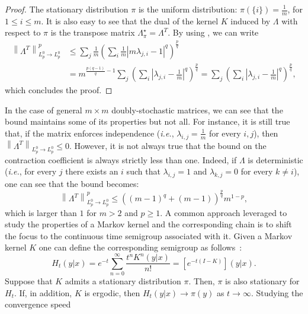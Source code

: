 \documentclass[11pt]{article}
\theoremstyle{plain}
\theoremstyle{remark}
\begin{document}
\begin{proof}
The stationary distribution $\pi$ is the uniform distribution: $\pi(\{i\})=\frac1m$, for $1\leq i \leq m$. It is also easy to see that the dual of the kernel $K$ induced by $\Lambda$ with respect to $\pi$ is the transpose matrix $\Lambda^\star_\pi = \Lambda^T$. By using , we can write
\begin{align}
    \left\lVert \Lambda^T  \right\rVert_{L_p^0 \to L_p^0}^p &\leq \sum_j \frac1m \left(\sum_i \frac1m |m\lambda_{j,i}-1|^q \right)^\frac{p}{q} \\
    &= m^{\frac{p (q-1)}{q}-1}\sum_j\left(\sum_i  \left|\lambda_{j,i}-\frac{1}{m}\right|^q \right)^\frac{p}{q} = \sum_j \left(\sum_i  \left|\lambda_{j,i}-\frac{1}{m}\right|^q \right)^\frac{p}{q}, \label{eq:mxmDoublyStochastic}
\end{align}
which concludes the proof.
\end{proof}
    In the case of general $m\times m$ doubly-stochastic matrices, we can see that the bound maintains some of its properties but not all. For instance, it is still true that, if the matrix enforces independence (\textit{i.e.}, $\lambda_{i,j}=\frac1m$ for every $i,j$), then $ \left\lVert \Lambda^T \right\rVert_{L_p^0\to L_p^0}\leq 0$. However, it is not always true that the bound on the contraction coefficient is always strictly less than one. Indeed, if $\Lambda$ is deterministic (\textit{i.e.}, for every $j$ there exists an $i$ such that $\lambda_{i,j}=1$ and $\lambda_{k,j}=0$ for every $k\neq i$), one can see that the bound becomes:
\begin{equation}
     \left\lVert \Lambda^T  \right\rVert_{L_p^0 \to L_p^0}^p \leq ((m-1)^q+(m-1))^\frac{p}{q} m^{1-p},
\end{equation}
which is larger than $1$ for $m>2$ and $p\geq 1$.\fi \iffalse 
  A common approach leveraged to study the properties of a Markov kernel and the corresponding chain is to shift the focus to the continuous time semigroup associated with it. Given a Markov kernel $K$ one can define the corresponding semigroup as follows~\cite{logSobMarkovChains}:
  \begin{equation}
      H_t(y|x) = e^{-t} \sum_{n=0}^\infty \frac{t^nK^n(y|x)}{n!} = \left[e^{-t(I-K)}\right](y|x).
  \end{equation}
  Suppose that $K$ admits a stationary distribution $\pi$. Then, $\pi$ is also stationary for $H_t$. If, in addition, $K$ is ergodic, then $H_t(y|x)\to \pi(y)$ as $t\to\infty$. Studying the convergence  speed %
\end{document}
